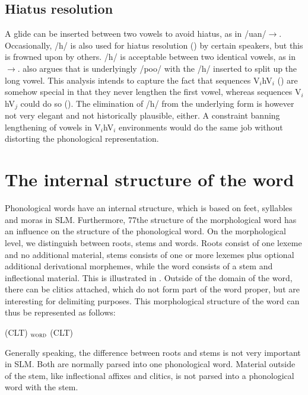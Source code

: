 \subsection{Hiatus resolution}\label{sec:phon:Hiatusresolution}
A glide can be inserted between two vowels  to avoid hiatus, as in /\dentt uan/$\to$. Occasionally, /h/ is also used for hiatus resolution () by certain speakers, but this is frowned upon by others. /h/ is acceptable between two identical vowels, as in $\to$. \citet{Tapovanaye1995} also argues that  is underlyingly /poo\ng/ with the /h/ inserted to split up the long vowel. This analysis intends to capture the fact that sequences V$_i$hV$_i$ ()  are somehow special in that they never lengthen the first vowel, whereas sequences V$_i$hV$_j$ could do so (). The elimination of /h/ from the underlying form is however not very elegant and not  historically plausible, either. A constraint banning lengthening of vowels in V$_i$hV$_i$ environments would do the same job without distorting the phonological representation.

\section{The internal structure of the word}\label{sec:phon:Theinternalstructureoftheword}
Phonological words have an internal structure, which is based on feet, syllables and moras in SLM. Furthermore, 77the structure of the morphological word has an influence on the structure of the phonological word.
On the  morphological level, we distinguish between roots, stems and words. Roots consist of one lexeme and no additional material, stems consists of one or more lexemes plus optional additional derivational morphemes, while the word consists of a stem and inflectional material. This is illustrated in . Outside of the domain of the word, there can be clitics attached, which do not form part of the word proper, but are interesting for delimiting purposes. This morphological structure of the word can thus be represented as follows:

\ea\label{ex:phon:rootsstemswords}
(CLT)
	$_{\textsc{word}}$
	(CLT)
\z

Generally speaking, the difference between roots and stems is not very important in SLM. Both are normally parsed into one phonological word. Material outside of the stem, like inflectional affixes and clitics, is not parsed into a phonological word with the stem.

